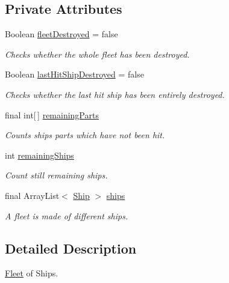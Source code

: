 \subsection*{Private Attributes}
\begin{DoxyCompactItemize}
\item 
Boolean \hyperlink{classbattleship2D_1_1model_1_1Fleet_aa99ad6c0b52656c039a1b6e77d7a4f63}{fleet\-Destroyed} = false
\begin{DoxyCompactList}\small\item\em Checks whether the whole fleet has been destroyed. \end{DoxyCompactList}\item 
Boolean \hyperlink{classbattleship2D_1_1model_1_1Fleet_ac9245d7670e8ba55860fccead366b077}{last\-Hit\-Ship\-Destroyed} = false
\begin{DoxyCompactList}\small\item\em Checks whether the last hit ship has been entirely destroyed. \end{DoxyCompactList}\item 
final int\mbox{[}$\,$\mbox{]} \hyperlink{classbattleship2D_1_1model_1_1Fleet_acdbb1599e55f36117c255ee49df1148b}{remaining\-Parts}
\begin{DoxyCompactList}\small\item\em Counts ships parts which have not been hit. \end{DoxyCompactList}\item 
int \hyperlink{classbattleship2D_1_1model_1_1Fleet_a1e12ebdbc19e847806d5e41f69576cf7}{remaining\-Ships}
\begin{DoxyCompactList}\small\item\em Count still remaining ships. \end{DoxyCompactList}\item 
final Array\-List$<$ \hyperlink{classbattleship2D_1_1model_1_1Ship}{Ship} $>$ \hyperlink{classbattleship2D_1_1model_1_1Fleet_a969e704ee79c18874d9dddcf98401014}{ships}
\begin{DoxyCompactList}\small\item\em A fleet is made of different ships. \end{DoxyCompactList}\end{DoxyCompactItemize}


\subsection{Detailed Description}
\hyperlink{classbattleship2D_1_1model_1_1Fleet}{Fleet} of Ships. 

